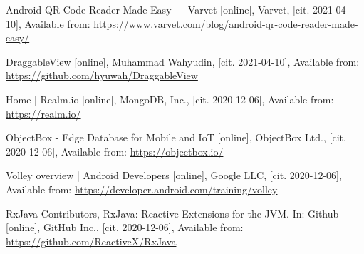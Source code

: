 \begin{thebibliography}{99}
 Android QR Code Reader Made Easy — Varvet [online], Varvet, [cit. 2021-04-10], Available from: \url{https://www.varvet.com/blog/android-qr-code-reader-made-easy/}

 DraggableView [online], Muhammad Wahyudin, [cit. 2021-04-10], Available from: \url{https://github.com/hyuwah/DraggableView}

 Home | Realm.io [online], MongoDB, Inc., [cit. 2020-12-06], Available from: \url{https://realm.io/}

 ObjectBox - Edge Database for Mobile and IoT [online], ObjectBox Ltd., [cit. 2020-12-06], Available from: \url{https://objectbox.io/}

 Volley overview | Android Developers [online], Google LLC, [cit. 2020-12-06], Available from: \url{https://developer.android.com/training/volley}

 RxJava Contributors, RxJava: Reactive Extensions for the JVM. In: Github [online], GitHub Inc., [cit. 2020-12-06], Available from: \url{https://github.com/ReactiveX/RxJava}


\end{thebibliography}